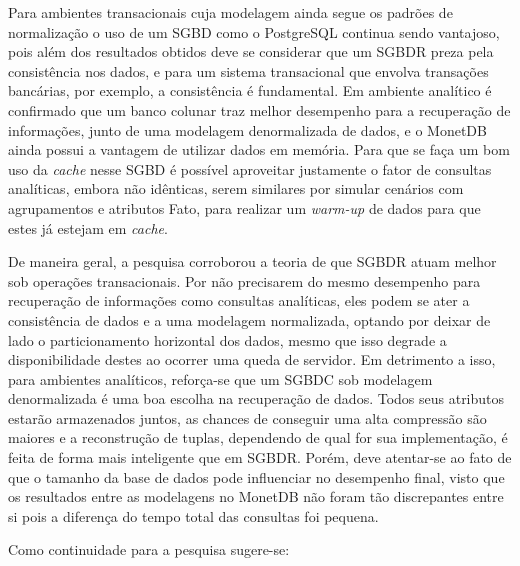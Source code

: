 Para ambientes transacionais cuja modelagem ainda segue os padrões de normalização o uso de um SGBD como o PostgreSQL continua sendo vantajoso, pois além dos resultados obtidos deve se considerar que um SGBDR preza pela consistência nos dados, e para um sistema transacional que envolva transações bancárias, por exemplo, a consistência é fundamental. Em ambiente analítico é confirmado que um banco colunar traz melhor desempenho para a recuperação de informações, junto de uma modelagem denormalizada de dados, e o MonetDB ainda possui a vantagem de utilizar dados em memória. Para que se faça um bom uso da \textit{cache} nesse SGBD é possível aproveitar justamente o fator de consultas analíticas, embora não idênticas, serem similares por simular cenários com agrupamentos e atributos Fato, para realizar um \textit{warm-up} de dados para que estes já estejam em \textit{cache}.

De maneira geral, a pesquisa corroborou a teoria de que SGBDR atuam melhor sob operações transacionais. Por não precisarem do mesmo desempenho para recuperação de informações como consultas analíticas, eles podem se ater a consistência de dados e a uma modelagem normalizada, optando por deixar de lado o particionamento horizontal dos dados, mesmo que isso degrade a disponibilidade destes ao ocorrer uma queda de servidor. Em detrimento a isso, para ambientes analíticos, reforça-se que um SGBDC sob modelagem denormalizada é uma boa escolha na recuperação de dados. Todos seus atributos estarão armazenados juntos, as chances de conseguir uma alta compressão são maiores e a reconstrução de tuplas, dependendo de qual for sua implementação, é feita de forma mais inteligente que em SGBDR. Porém, deve atentar-se ao fato de que o tamanho da base de dados pode influenciar no desempenho final, visto que os resultados entre as modelagens no MonetDB não foram tão discrepantes entre si pois a diferença do tempo total das consultas foi pequena.


Como continuidade para a pesquisa sugere-se:

